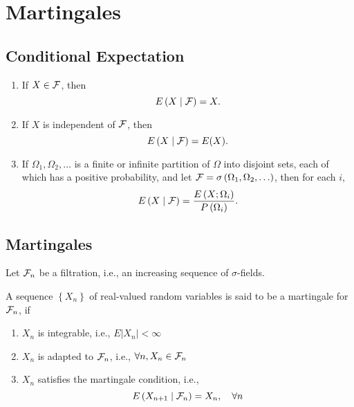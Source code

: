 \chapter{Martingales}

\section{Conditional Expectation}

\begin{definition}

\end{definition}

\begin{example}
	\begin{enumerate}
		\item If \(X\in\mathcal{F}\), then
		      \begin{equation*}
			      E\left(X\mid\mathcal{F}\right)=X.
		      \end{equation*}
		\item If \(X\) is independent of \(\mathcal{F}\), then
		      \begin{equation*}
			      E\left(X\mid\mathcal{F}\right)=E(X).
		      \end{equation*}
		\item If \(\Omega_{1}, \Omega_{2}, \ldots\) is a finite or infinite partition of \(\Omega\) into disjoint sets, each of which has a positive probability, and let \(\mathcal{F}=\sigma\left(\Omega_{1},\Omega_{2},\ldots\right)\), then for each \(i\),
		      \begin{equation*}
			      E\left(X\mid\mathcal{F}\right)=\frac{E\left(X;\Omega_{i}\right)}{P\left(\Omega_{i}\right)}.
		      \end{equation*}
	\end{enumerate}
\end{example}

\begin{property}

\end{property}

\section{Martingales}

Let \(\mathcal{F}_{n}\) be a filtration, i.e., an increasing sequence of \(\sigma\)-fields.
\begin{definition}[Martingale]
	A sequence \(\left\{X_{n}\right\}\) of real-valued random variables  is said to be a martingale for \(\mathcal{F}_{n}\), if
	\begin{enumerate}
		\item \(X_{n}\) is integrable, i.e., \(E\left|X_{n}\right|<\infty\)
		\item \(X_{n}\) is adapted to \(\mathcal{F}_{n}\), i.e., \(\forall n,X_{n}\in \mathcal{F}_{n}\)
		\item \(X_{n}\) satisfies the martingale condition, i.e.,
		      \begin{equation}
			      E\left(X_{n+1}\mid\mathcal{F}_{n}\right)=X_{n},\quad\forall n
		      \end{equation}
	\end{enumerate}
\end{definition}

